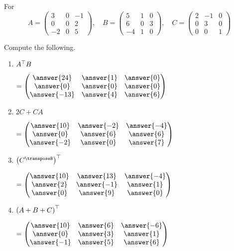 \documentclass{ximera}
\author{Parisa Fatheddin}
\begin{document}
\begin{exercise}
  For
  \begin{equation*}
    A =
    \begin{pmatrix}
      3 & 0 & -1\\
      0 & 0 & 2\\
      -2 & 0 & 5
    \end{pmatrix},\quad
    B =
    \begin{pmatrix}
    5 & 1 & 0\\
    6 & 0 & 3\\
    -4 & 1 & 0
  \end{pmatrix},\quad
  C =
  \begin{pmatrix}
  2 & -1 & 0\\
  0 & 3 & 0 \\
  0 & 0 & 1
\end{pmatrix}
\end{equation*}

Compute the following.
\begin{enumerate}
\item $A^\top B$
  \begin{prompt} $\displaystyle =
    \begin{pmatrix}
      \answer{24} & \answer{1} & \answer{0}\\
      \answer{0} & \answer{0} & \answer{0}\\
      \answer{-13} & \answer{4} & \answer{6}
    \end{pmatrix}$
  \end{prompt}

\item $2C + CA$
  \begin{prompt} $\displaystyle =
    \begin{pmatrix}
      \answer{10} & \answer{-2} & \answer{-4}\\
      \answer{0} & \answer{6} & \answer{6}\\
      \answer{-2} & \answer{0} & \answer{7}
    \end{pmatrix}$
  \end{prompt}

\item $\left( C^\transposeB  \right)^\transpose$
  \begin{prompt} $\displaystyle =
    \begin{pmatrix}
      \answer{10} & \answer{13} & \answer{-4}\\
      \answer{2} & \answer{-1} & \answer{1}\\
      \answer{0} & \answer{9} & \answer{0}
    \end{pmatrix}$
  \end{prompt}

\item $\left(A + B + C\right)^\top $
  \begin{prompt} $\displaystyle =
    \begin{pmatrix}
      \answer{10} & \answer{6} & \answer{-6}\\
      \answer{0} & \answer{3} & \answer{1}\\
      \answer{-1} & \answer{5} & \answer{6}
    \end{pmatrix}$
  \end{prompt}
\end{enumerate}
\end{exercise}
\end{document}
